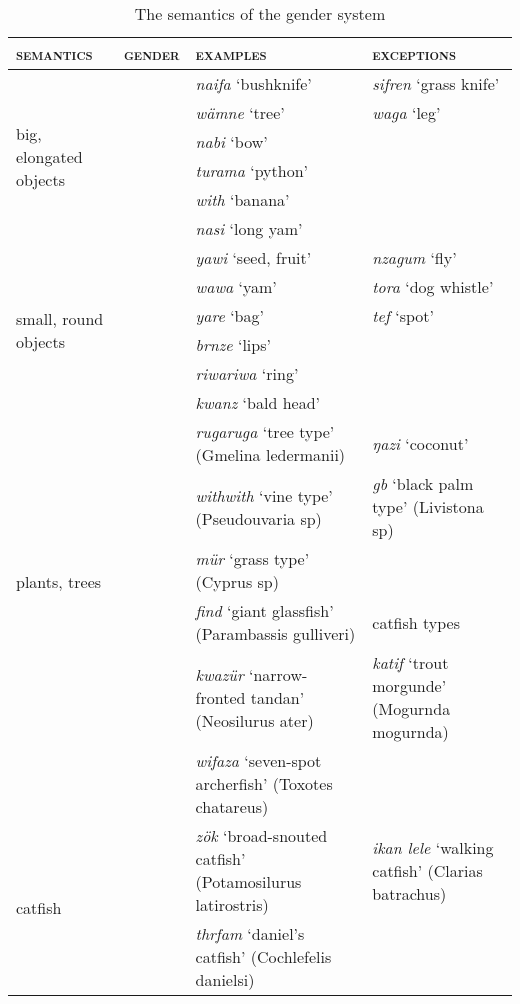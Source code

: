 {\renewcommand{\tabcolsep}{3pt}
\begin{table}
\caption{The semantics of the gender system}
\label{wordclasses-gendersem}
	\begin{tabular}	{p{2cm}lp{}p{}}
		\lsptoprule
		\textsc{semantics}&\textsc{gender}&\textsc{examples}&\textsc{exceptions}\\\midrule
		\multirow{6}{1,8cm}{big, elongated objects}&\multirow{6}{*}{\Masc}&\emph{naifa} `bushknife'&\emph{sifren} `grass knife'\\
		&&\emph{wämne} `tree'&\emph{waga} `leg'\\
		&&\emph{nabi} `bow'&\\
		&&\emph{turama} `python'&\\
		&&\emph{with} `banana'&\\
		&&\emph{nasi} `long yam'&\\\midrule
		\multirow{6}{1,8cm}{small, round objects}&\multirow{6}{*}{\F}&\emph{yawi} `seed, fruit'&\emph{nzagum} `fly'\\
		&&\emph{wawa} `yam'&\emph{tora} `dog whistle'\\
		&&\emph{yare} `bag'&\emph{tef} `spot'\\
		&&\emph{brnze} `lips'&\\
		&&\emph{riwariwa} `ring'&\\
		&&\emph{kwanz} `bald head'&\\\midrule
		\multirow{5}{1,8cm}{plants, trees}&\multirow{5}{*}{\Masc}&\emph{rugaruga} `tree type' (Gmelina ledermanii)&\emph{ŋazi} `coconut'\\
		&&\emph{withwith} `vine type' (Pseudouvaria sp)&\emph{gb} `black palm type' (Livistona sp)\\
		&&\emph{mür} `grass type' (Cyprus sp)&\\\midrule
		\multirow{6}{1,8cm}{fish}&\multirow{6}{*}{\Masc}&\emph{find} `giant glassfish' (Parambassis gulliveri)&catfish types\\
		&&\emph{kwazür} `narrow-fronted tandan' (Neosilurus ater)&\emph{katif} `trout morgunde' (Mogurnda mogurnda)\\
		&&\emph{wifaza} `seven-spot archerfish' (Toxotes chatareus)&\\\midrule
		\multirow{4}{1,8cm}{catfish}&\multirow{4}{*}{\F}&\emph{zök} `broad-snouted catfish' (Potamosilurus latirostris)&\emph{ikan lele} `walking catfish' (Clarias batrachus)\\
		&&\emph{thrfam} `daniel's catfish' (Cochlefelis danielsi)&\\\midrule

\end{tabular}
\end{table}}
